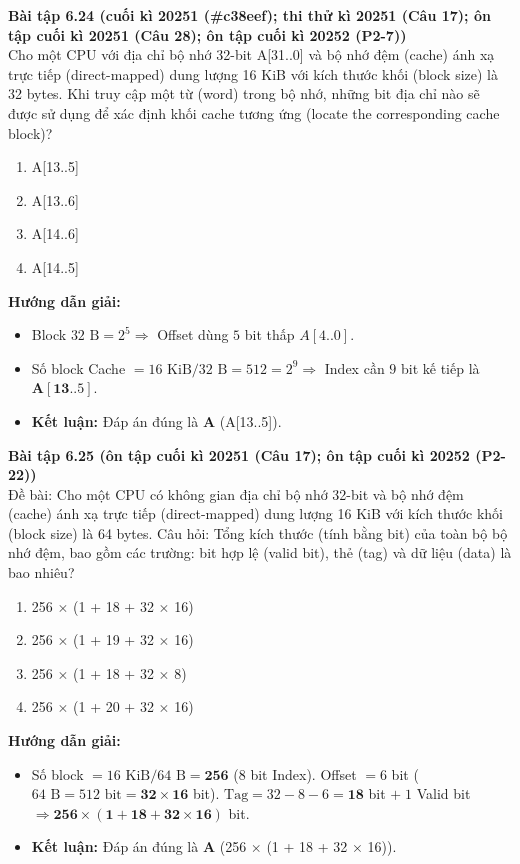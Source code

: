 \textbf{Bài tập 6.24 (cuối kì 20251 (\#c38eef); thi thử kì 20251 (Câu 17); ôn tập cuối kì 20251 (Câu 28); ôn tập cuối kì 20252 (P2-7))}\\
Cho một CPU với địa chỉ bộ nhớ 32-bit A[31..0] và bộ nhớ đệm (cache) ánh xạ trực tiếp (direct-mapped) dung lượng 16 KiB với kích thước khối (block size) là 32 bytes. Khi truy cập một từ (word) trong bộ nhớ, những bit địa chỉ nào sẽ được sử dụng để xác định khối cache tương ứng (locate the corresponding cache block)?
\begin{enumerate}[label=\Alph*.]
    \item A[13..5]
    \item A[13..6]
    \item A[14..6]
    \item A[14..5]
\end{enumerate}
\textbf{Hướng dẫn giải:}
\begin{itemize}
    \item Block $32\text{ B} = 2^5 \Rightarrow$ Offset dùng $5$ bit thấp $A[4..0]$.
    \item Số block Cache $= 16\text{ KiB} / 32\text{ B} = 512 = 2^9 \Rightarrow$ Index cần $9$ bit kế tiếp là $\mathbf{A[13..5]}$.
    \item \textbf{Kết luận:} Đáp án đúng là \textbf{A} (A[13..5]).
\end{itemize}

\textbf{Bài tập 6.25 (ôn tập cuối kì 20251 (Câu 17); ôn tập cuối kì 20252 (P2-22))}\\
Đề bài: Cho một CPU có không gian địa chỉ bộ nhớ 32-bit và bộ nhớ đệm (cache) ánh xạ trực tiếp (direct-mapped) dung lượng 16 KiB với kích thước khối (block size) là 64 bytes.
Câu hỏi: Tổng kích thước (tính bằng bit) của toàn bộ bộ nhớ đệm, bao gồm các trường: bit hợp lệ (valid bit), thẻ (tag) và dữ liệu (data) là bao nhiêu?
\begin{enumerate}[label=\Alph*.]
    \item 256 $\times$ (1 + 18 + 32 $\times$ 16)
    \item 256 $\times$ (1 + 19 + 32 $\times$ 16)
    \item 256 $\times$ (1 + 18 + 32 $\times$ 8)
    \item 256 $\times$ (1 + 20 + 32 $\times$ 16)
\end{enumerate}
\textbf{Hướng dẫn giải:}
\begin{itemize}
    \item Số block $= 16\text{ KiB} / 64\text{ B} = \mathbf{256}$ ($8$ bit Index). Offset $= 6$ bit ($64\text{ B} = 512\text{ bit} = \mathbf{32 \times 16}$ bit). $\text{Tag} = 32 - 8 - 6 = \mathbf{18}$ bit $+\; 1$ Valid bit $\Rightarrow \mathbf{256 \times (1 + 18 + 32 \times 16)}$ bit.
    \item \textbf{Kết luận:} Đáp án đúng là \textbf{A} (256 $\times$ (1 + 18 + 32 $\times$ 16)).
\end{itemize}

